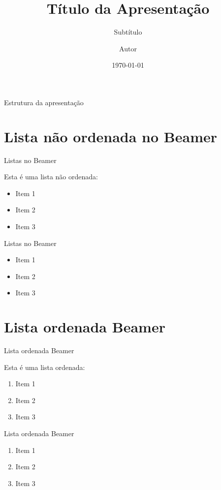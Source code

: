 \documentclass{beamer}        %
\title{Título da Apresentação}  %
\subtitle{Subtítulo} 			%
\author{Autor}				 	%
\institute{Nome da instituição} %
\date{\today} %
\begin{document}
	
	\begin{frame}
		\titlepage 
	\end{frame}
	
		
	\begin{frame}{Estrutura da apresentação}
		\tableofcontents
	\end{frame}


\section{Lista não ordenada no Beamer}
\begin{frame}{Listas no Beamer}
	
	Esta é uma lista não ordenada:
	\begin{itemize}
		\item Item 1
		\item Item 2
		\item Item 3
	\end{itemize}
	
\end{frame}

\begin{frame}{Listas no Beamer}
	
	\begin{itemize}
		\item Item 1
		\item Item 2
		\item Item 3
	\end{itemize}
	
\end{frame}

\section{Lista ordenada Beamer}
\begin{frame}{Lista ordenada Beamer}
	
		Esta é uma lista ordenada:
	\begin{enumerate}
		\item Item 1
		\item Item 2
		\item Item 3
	\end{enumerate}

\end{frame} 

\begin{frame}{Lista ordenada Beamer}
	
	\begin{enumerate}
		\item Item 1
		\item Item 2
		\item Item 3
	\end{enumerate}
	
\end{frame} 
\end{document}
